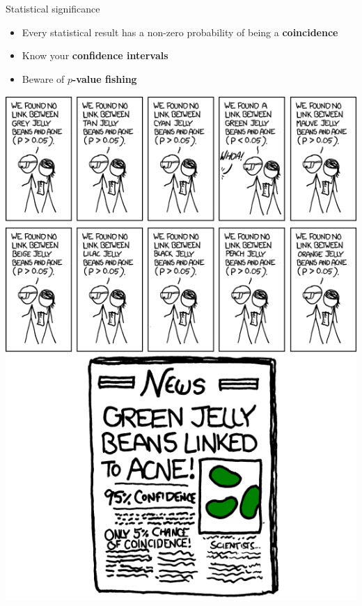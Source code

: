 \begin{frame}{Statistical significance}
	\begin{itemize}
		\pause\item Every statistical result has a non-zero probability of being a \textbf{coincidence}
		\pause\item Know your \textbf{confidence intervals}
		\pause\item Beware of \textbf{$p$-value fishing}
	\end{itemize}
\end{frame}

\begin{frame}
	\begin{center}
		\includegraphics[height=0.9\textheight]{xkcd_significant_crop}
	\end{center}	
\end{frame}

